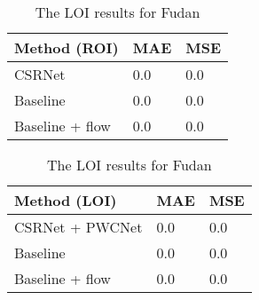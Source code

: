 \begin{table}[!htb]
    \begin{minipage}{.5\linewidth}
      \centering
		\begin{tabular}{lll}
		\hline
		Method (ROI)                               & MAE & MSE \\ \hline
		\multicolumn{1}{l|}{CSRNet}          & 0.0 & 0.0 \\
		\multicolumn{1}{l|}{Baseline}        & 0.0 & 0.0 \\
		\multicolumn{1}{l|}{Baseline + flow} & 0.0 & 0.0 \\ \hline
		\end{tabular}
		\caption{\label{tab:roi_fudan}The ROI results for Fudan}
	\end{minipage}
	\begin{minipage}{.5\linewidth}
      \centering
		\begin{tabular}{lll}
		\hline
		Method (LOI)                               & MAE & MSE \\ \hline
		\multicolumn{1}{l|}{CSRNet + PWCNet}          & 0.0 & 0.0 \\
		\multicolumn{1}{l|}{Baseline}        & 0.0 & 0.0 \\
		\multicolumn{1}{l|}{Baseline + flow} & 0.0 & 0.0 \\ \hline
		\end{tabular}
		\caption{\label{tab:loi_fudan}The LOI results for Fudan}
	\end{minipage}
\end{table}


